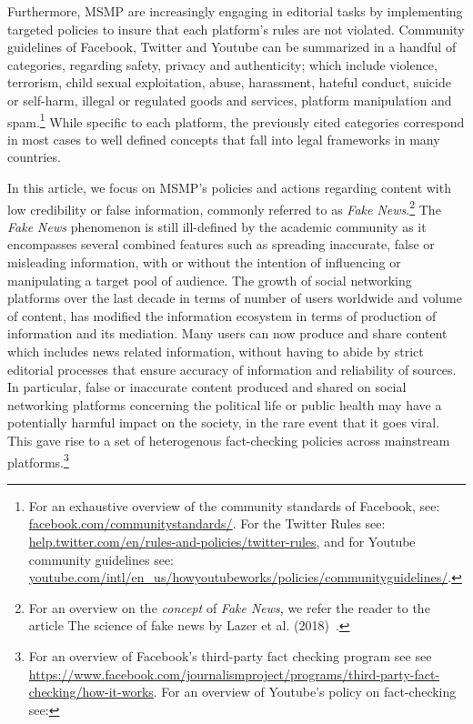 \documentclass{article}
\begin{document}
\smallskip

Furthermore, MSMP are increasingly engaging in editorial tasks by implementing targeted policies to insure that each platform's rules are not violated. Community guidelines of Facebook, Twitter and Youtube can be summarized in a handful of categories, regarding safety, privacy and authenticity; which include violence, terrorism, child sexual exploitation, abuse, harassment, hateful conduct, suicide or self-harm, illegal or regulated goods and services, platform manipulation and spam.\footnote{For an exhaustive overview of the community standards of Facebook, see: \href{https://www.facebook.com/communitystandards/}{facebook.com/communitystandards/}. For the Twitter  Rules see: \href{https://help.twitter.com/en/rules-and-policies/twitter-rules}{help.twitter.com/en/rules-and-policies/twitter-rules}, and for Youtube community guidelines see: \href{https://www.youtube.com/intl/en\_us/howyoutubeworks/policies/community\-guidelines/}{youtube.com/intl/en\_us/howyoutubeworks/policies/community\-guidelines/}.} While specific to each platform, the previously cited categories correspond in most cases to well defined concepts that fall into legal frameworks in many countries. 

\smallskip

In this article, we focus on MSMP's policies and actions regarding content with low credibility or false information, commonly referred to as {\it Fake News}.\footnote{For an overview on the {\it concept} of {\it Fake News}, we refer the reader to the article The science of fake news by Lazer et al. (2018)~\cite{lazer}.} The {\it Fake News} phenomenon is still ill-defined by the academic community as it encompasses several combined features such as spreading inaccurate, false or misleading information, with or without the intention of influencing or manipulating a target pool of audience. The growth of social networking platforms over the last decade in terms of number of users worldwide and volume of content, has modified the information ecosystem in terms of production of information and its mediation. Many users can now produce and share content which includes news related information, without having to abide by strict editorial processes that ensure accuracy of information and reliability of sources. In particular, false or inaccurate content produced and shared on social networking platforms concerning the political life or public health may have a potentially harmful impact on the society, in the rare event that it goes viral. This gave rise to a set of heterogenous fact-checking policies across mainstream platforms.\footnote{For an overview of Facebook's third-party fact checking program see see \href{https://www.facebook.com/journalismproject/programs/third-party-fact-checking/how-it-works}{https://www.facebook.com/journalismproject/programs/third-party-fact-checking/how-it-works}. For an overview of Youtube's policy on fact-checking see:  }
 
\end{document}
